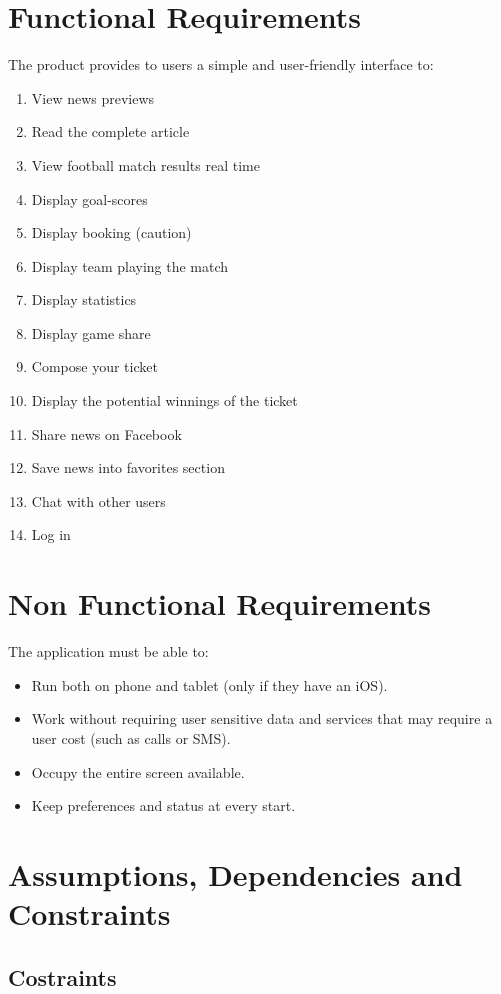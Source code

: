 \documentclass[numbers=noenddot, 12pt, a4paper, oneside]{scrbook}
\begin{document}
\section{Functional Requirements}
The product provides to users a simple and user-friendly interface to:
\begin{enumerate}
	\item View news previews
	\item Read the complete article
	\item View football match results real time
	\item Display goal-scores
	\item Display booking (caution)
	\item Display team playing the match
	\item Display statistics
	\item Display game share 
	\item Compose your ticket
	\item Display the potential winnings of the ticket
	\item Share news on Facebook
	\item Save news into favorites section
	\item Chat with other users
	\item Log in
\end{enumerate}
\section{Non Functional Requirements}
The application must be able to:
\begin{itemize}
	\item Run both on phone and tablet (only if they have an iOS).
	\item Work without requiring user sensitive data and services that may require a user cost (such as calls or SMS).
	\item Occupy the entire screen available.
	\item Keep preferences and status at every start.
\end{itemize}

\section{Assumptions, Dependencies and Constraints\\}

\subsection*{Costraints}
\end{document}

